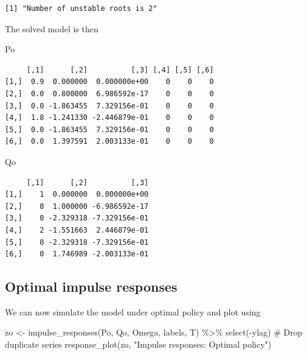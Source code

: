 \documentclass[
  letterpaper,
]{book}
\newenvironment{Shaded}{\begin{snugshade}}{\end{snugshade}}
\newcommand{\CommentTok}[1]{\textcolor[rgb]{0.37,0.37,0.37}{#1}}
\newcommand{\FunctionTok}[1]{\textcolor[rgb]{0.28,0.35,0.67}{#1}}
\newcommand{\NormalTok}[1]{\textcolor[rgb]{0.00,0.23,0.31}{#1}}
\newcommand{\OtherTok}[1]{\textcolor[rgb]{0.00,0.23,0.31}{#1}}
\newcommand{\SpecialCharTok}[1]{\textcolor[rgb]{0.37,0.37,0.37}{#1}}
\newcommand{\StringTok}[1]{\textcolor[rgb]{0.13,0.47,0.30}{#1}}
\begin{document}
\begin{verbatim}
[1] "Number of unstable roots is 2"
\end{verbatim}

\begin{Shaded}
\end{Shaded}

The solved model is then

\begin{Shaded}
\begin{Highlighting}[]
\NormalTok{Po}
\end{Highlighting}
\end{Shaded}

\begin{verbatim}
     [,1]      [,2]          [,3] [,4] [,5] [,6]
[1,]  0.9  0.000000  0.000000e+00    0    0    0
[2,]  0.0  0.800000  6.986592e-17    0    0    0
[3,]  0.0 -1.863455  7.329156e-01    0    0    0
[4,]  1.8 -1.241330 -2.446879e-01    0    0    0
[5,]  0.0 -1.863455  7.329156e-01    0    0    0
[6,]  0.0  1.397591  2.003133e-01    0    0    0
\end{verbatim}

\begin{Shaded}
\begin{Highlighting}[]
\NormalTok{Qo}
\end{Highlighting}
\end{Shaded}

\begin{verbatim}
     [,1]      [,2]          [,3]
[1,]    1  0.000000  0.000000e+00
[2,]    0  1.000000 -6.986592e-17
[3,]    0 -2.329318 -7.329156e-01
[4,]    2 -1.551663  2.446879e-01
[5,]    0 -2.329318 -7.329156e-01
[6,]    0  1.746989 -2.003133e-01
\end{verbatim}

\hypertarget{optimal-impulse-responses}{%
\subsection{Optimal impulse responses}\label{optimal-impulse-responses}}

We can now simulate the model under optimal policy and plot using

\begin{Shaded}
\begin{Highlighting}[]
\NormalTok{zo }\OtherTok{\textless{}{-}} \FunctionTok{impulse\_responses}\NormalTok{(Po, Qo, Omega, labels, T) }\SpecialCharTok{\%\textgreater{}\%}
  \FunctionTok{select}\NormalTok{(}\SpecialCharTok{{-}}\NormalTok{ylag) }\CommentTok{\# Drop duplicate series}
\FunctionTok{response\_plot}\NormalTok{(zo, }\StringTok{"Impulse responses: Optimal policy"}\NormalTok{)}
\end{Highlighting}
\end{Shaded}
\end{document}
